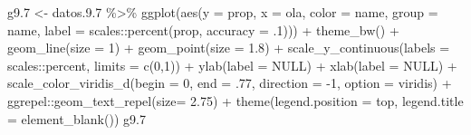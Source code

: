 \documentclass[
  12pt,
]{book}
\newenvironment{Shaded}{\begin{snugshade}}{\end{snugshade}}
\newcommand{\AttributeTok}[1]{\textcolor[rgb]{0.77,0.63,0.00}{#1}}
\newcommand{\ConstantTok}[1]{\textcolor[rgb]{0.00,0.00,0.00}{#1}}
\newcommand{\DecValTok}[1]{\textcolor[rgb]{0.00,0.00,0.81}{#1}}
\newcommand{\FloatTok}[1]{\textcolor[rgb]{0.00,0.00,0.81}{#1}}
\newcommand{\FunctionTok}[1]{\textcolor[rgb]{0.00,0.00,0.00}{#1}}
\newcommand{\NormalTok}[1]{#1}
\newcommand{\OtherTok}[1]{\textcolor[rgb]{0.56,0.35,0.01}{#1}}
\newcommand{\SpecialCharTok}[1]{\textcolor[rgb]{0.00,0.00,0.00}{#1}}
\newcommand{\StringTok}[1]{\textcolor[rgb]{0.31,0.60,0.02}{#1}}
\begin{document}
\begin{Shaded}
\begin{Highlighting}[]
\NormalTok{g9}\FloatTok{.7} \OtherTok{\textless{}{-}}\NormalTok{ datos.}\FloatTok{9.7} \SpecialCharTok{\%\textgreater{}\%} 
  \FunctionTok{ggplot}\NormalTok{(}\FunctionTok{aes}\NormalTok{(}\AttributeTok{y =}\NormalTok{ prop, }\AttributeTok{x =}\NormalTok{ ola, }\AttributeTok{color =}\NormalTok{ name, }\AttributeTok{group =}\NormalTok{ name,}
             \AttributeTok{label =}\NormalTok{ scales}\SpecialCharTok{::}\FunctionTok{percent}\NormalTok{(prop, }\AttributeTok{accuracy =}\NormalTok{ .}\DecValTok{1}\NormalTok{))) }\SpecialCharTok{+}
  \FunctionTok{theme\_bw}\NormalTok{() }\SpecialCharTok{+}   
  \FunctionTok{geom\_line}\NormalTok{(}\AttributeTok{size =} \DecValTok{1}\NormalTok{) }\SpecialCharTok{+}
  \FunctionTok{geom\_point}\NormalTok{(}\AttributeTok{size =} \FloatTok{1.8}\NormalTok{) }\SpecialCharTok{+}
  \FunctionTok{scale\_y\_continuous}\NormalTok{(}\AttributeTok{labels =}\NormalTok{ scales}\SpecialCharTok{::}\NormalTok{percent,}
                     \AttributeTok{limits =} \FunctionTok{c}\NormalTok{(}\DecValTok{0}\NormalTok{,}\DecValTok{1}\NormalTok{)) }\SpecialCharTok{+}
  \FunctionTok{ylab}\NormalTok{(}\AttributeTok{label =} \ConstantTok{NULL}\NormalTok{) }\SpecialCharTok{+}
  \FunctionTok{xlab}\NormalTok{(}\AttributeTok{label =} \ConstantTok{NULL}\NormalTok{) }\SpecialCharTok{+}
  \FunctionTok{scale\_color\_viridis\_d}\NormalTok{(}\AttributeTok{begin =} \DecValTok{0}\NormalTok{, }\AttributeTok{end =}\NormalTok{ .}\DecValTok{77}\NormalTok{, }\AttributeTok{direction =} \SpecialCharTok{{-}}\DecValTok{1}\NormalTok{, }\AttributeTok{option =} \StringTok{\textquotesingle{}viridis\textquotesingle{}}\NormalTok{) }\SpecialCharTok{+}
\NormalTok{  ggrepel}\SpecialCharTok{::}\FunctionTok{geom\_text\_repel}\NormalTok{(}\AttributeTok{size=} \FloatTok{2.75}\NormalTok{) }\SpecialCharTok{+}
  \FunctionTok{theme}\NormalTok{(}\AttributeTok{legend.position =} \StringTok{\textquotesingle{}top\textquotesingle{}}\NormalTok{,}
        \AttributeTok{legend.title =} \FunctionTok{element\_blank}\NormalTok{())}
\NormalTok{g9}\FloatTok{.7}
\end{Highlighting}
\end{Shaded}
\end{document}
